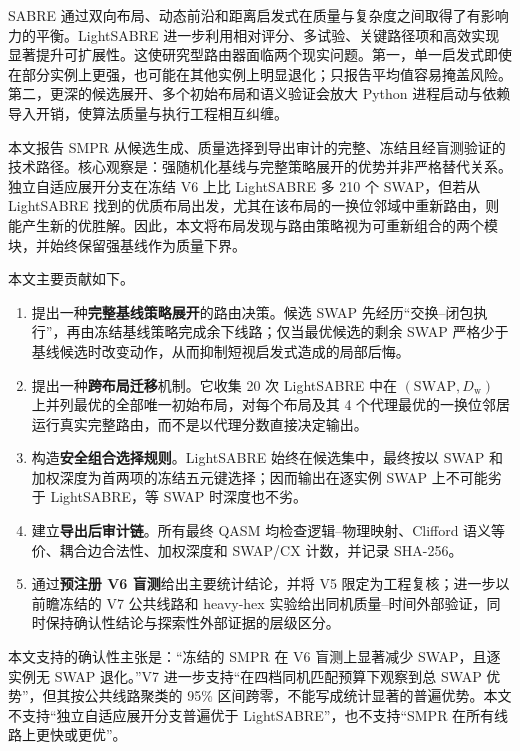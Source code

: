 \documentclass[11pt,a4paper]{article}
\newcommand{\DepthW}{D_{\mathrm w}}
\begin{document}
SABRE 通过双向布局、动态前沿和距离启发式在质量与复杂度之间取得了有影响力的平衡\citep{Li2019SABRE}。LightSABRE 进一步利用相对评分、多试验、关键路径项和高效实现显著提升可扩展性\citep{Zou2024LightSABRE}。这使研究型路由器面临两个现实问题。第一，单一启发式即使在部分实例上更强，也可能在其他实例上明显退化；只报告平均值容易掩盖风险。第二，更深的候选展开、多个初始布局和语义验证会放大 Python 进程启动与依赖导入开销，使算法质量与执行工程相互纠缠。

本文报告 SMPR 从候选生成、质量选择到导出审计的完整、冻结且经盲测验证的技术路径。核心观察是：强随机化基线与完整策略展开的优势并非严格替代关系。独立自适应展开分支在冻结 V6 上比 LightSABRE 多 210 个 SWAP，但若从 LightSABRE 找到的优质布局出发，尤其在该布局的一换位邻域中重新路由，则能产生新的优胜解。因此，本文将布局发现与路由策略视为可重新组合的两个模块，并始终保留强基线作为质量下界。

本文主要贡献如下。

\begin{enumerate}[label=(\arabic*),itemsep=0.35em]
  \item 提出一种\textbf{完整基线策略展开}的路由决策。候选 SWAP 先经历“交换--闭包执行”，再由冻结基线策略完成余下线路；仅当最优候选的剩余 SWAP 严格少于基线候选时改变动作，从而抑制短视启发式造成的局部后悔。
  \item 提出一种\textbf{跨布局迁移}机制。它收集 20 次 LightSABRE 中在 $(\mathrm{SWAP},\DepthW)$ 上并列最优的全部唯一初始布局，对每个布局及其 4 个代理最优的一换位邻居运行真实完整路由，而不是以代理分数直接决定输出。
  \item 构造\textbf{安全组合选择规则}。LightSABRE 始终在候选集中，最终按以 SWAP 和加权深度为首两项的冻结五元键选择；因而输出在逐实例 SWAP 上不可能劣于 LightSABRE，等 SWAP 时深度也不劣。
  \item 建立\textbf{导出后审计链}。所有最终 QASM 均检查逻辑--物理映射、Clifford 语义等价、耦合边合法性、加权深度和 SWAP/CX 计数，并记录 SHA-256。
  \item 通过\textbf{预注册 V6 盲测}给出主要统计结论，并将 V5 限定为工程复核；进一步以前瞻冻结的 V7 公共线路和 heavy-hex 实验给出同机质量--时间外部验证，同时保持确认性结论与探索性外部证据的层级区分。
\end{enumerate}

\begin{claimbox}[title={本文的证据边界}]
本文支持的确认性主张是：“冻结的 SMPR 在 V6 盲测上显著减少 SWAP，且逐实例无 SWAP 退化。”V7 进一步支持“在四档同机匹配预算下观察到总 SWAP 优势”，但其按公共线路聚类的 95\% 区间跨零，不能写成统计显著的普遍优势。本文不支持“独立自适应展开分支普遍优于 LightSABRE”，也不支持“SMPR 在所有线路上更快或更优”。
\end{claimbox}
\end{document}
